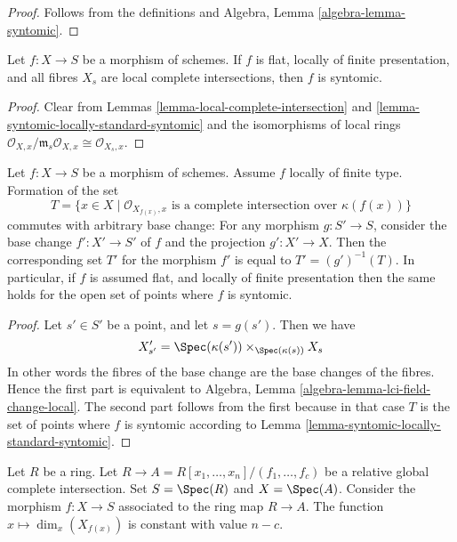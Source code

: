 \begin{proof}
Follows from the definitions and
Algebra, Lemma \ref{algebra-lemma-syntomic}.
\end{proof}

\begin{lemma}
\label{lemma-syntomic-flat-fibres}
Let $f : X \to S$ be a morphism of schemes.
If $f$ is flat, locally of finite presentation, and all
fibres $X_s$ are local complete intersections, then $f$
is syntomic.
\end{lemma}

\begin{proof}
Clear from Lemmas
\ref{lemma-local-complete-intersection} and
\ref{lemma-syntomic-locally-standard-syntomic}
and the isomorphisms of local rings
$
\mathcal{O}_{X, x}/\mathfrak m_s \mathcal{O}_{X, x}
\cong
\mathcal{O}_{X_s, x}
$.
\end{proof}

\begin{lemma}
\label{lemma-set-points-where-fibres-lci}
Let $f : X \to S$ be a morphism of schemes.
Assume $f$ locally of finite type. Formation of the set
$$
T = \{x \in X \mid \mathcal{O}_{X_{f(x)}, x}
\text{ is a complete intersection over }\kappa(f(x))\}
$$
commutes with arbitrary base change:
For any morphism $g : S' \to S$, consider
the base change $f' : X' \to S'$ of $f$ and the
projection $g' : X' \to X$. Then the corresponding
set $T'$ for the morphism $f'$ is equal to $T' = (g')^{-1}(T)$.
In particular, if $f$ is assumed flat, and locally of finite
presentation then the same holds for the open set of points
where $f$ is syntomic.
\end{lemma}

\begin{proof}
Let $s' \in S'$ be a point, and let $s = g(s')$. Then we have
$$
X'_{s'} =
\Spec(\kappa(s')) \times_{\Spec(\kappa(s))} X_s
$$
In other words the fibres of the base change are the base changes
of the fibres. Hence the first part is equivalent to
Algebra, Lemma \ref{algebra-lemma-lci-field-change-local}.
The second part follows from the first because in that case
$T$ is the set of points where $f$ is syntomic according to
Lemma \ref{lemma-syntomic-locally-standard-syntomic}.
\end{proof}

\begin{lemma}
\label{lemma-standard-syntomic-relative-dimension}
Let $R$ be a ring.
Let $R \to A = R[x_1, \ldots, x_n]/(f_1, \ldots, f_c)$ be a relative
global complete intersection. Set $S = \Spec(R)$ and
$X = \Spec(A)$. Consider the morphism
$f : X \to S$ associated to the ring map $R \to A$.
The function $x \mapsto \dim_x(X_{f(x)})$ is constant with value $n - c$.
\end{lemma}

